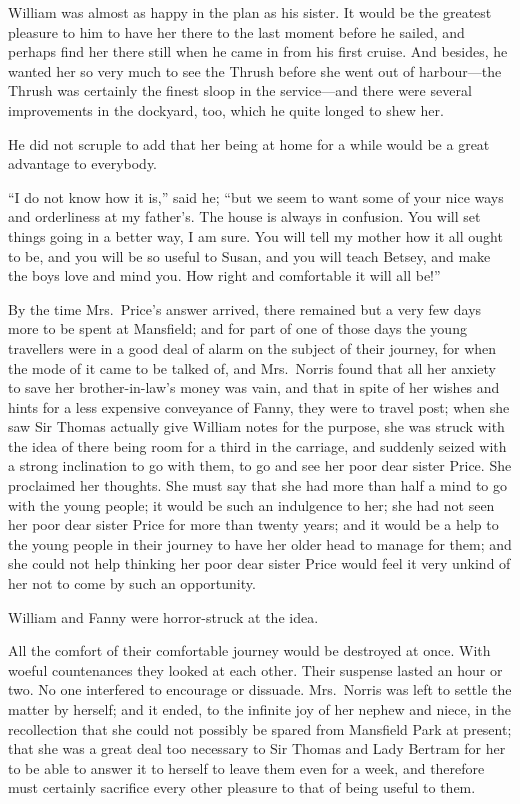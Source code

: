 \documentclass{article}
\begin{document}
William was almost as happy in the plan as his sister.
It would be the greatest pleasure to him to have her there
to the last moment before he sailed, and perhaps find
her there still when he came in from his first cruise.
And besides, he wanted her so very much to see the Thrush
before she went out of harbour---the Thrush was certainly
the finest sloop in the service---and there were several
improvements in the dockyard, too, which he quite longed to
shew her.

He did not scruple to add that her being at home
for a while would be a great advantage to everybody.

``I do not know how it is,'' said he; ``but we seem to want
some of your nice ways and orderliness at my father's. The
house is always in confusion.  You will set things going
in a better way, I am sure.  You will tell my mother how it
all ought to be, and you will be so useful to Susan, and you
will teach Betsey, and make the boys love and mind you.
How right and comfortable it will all be!''

By the time Mrs.\ Price's answer arrived, there remained
but a very few days more to be spent at Mansfield;
and for part of one of those days the young travellers
were in a good deal of alarm on the subject of their
journey, for when the mode of it came to be talked of,
and Mrs.\ Norris found that all her anxiety to save her
brother-in-law's money was vain, and that in spite of her
wishes and hints for a less expensive conveyance of Fanny,
they were to travel post; when she saw Sir Thomas actually
give William notes for the purpose, she was struck with
the idea of there being room for a third in the carriage,
and suddenly seized with a strong inclination to go
with them, to go and see her poor dear sister Price.
She proclaimed her thoughts.  She must say that she
had more than half a mind to go with the young people;
it would be such an indulgence to her; she had not seen
her poor dear sister Price for more than twenty years;
and it would be a help to the young people in their journey
to have her older head to manage for them; and she could
not help thinking her poor dear sister Price would feel it
very unkind of her not to come by such an opportunity.

William and Fanny were horror-struck at the idea.

All the comfort of their comfortable journey would
be destroyed at once.  With woeful countenances they
looked at each other.  Their suspense lasted an hour
or two.  No one interfered to encourage or dissuade.
Mrs.\ Norris was left to settle the matter by herself;
and it ended, to the infinite joy of her nephew and niece,
in the recollection that she could not possibly be spared
from Mansfield Park at present; that she was a great deal
too necessary to Sir Thomas and Lady Bertram for her to be
able to answer it to herself to leave them even for a week,
and therefore must certainly sacrifice every other pleasure
to that of being useful to them.
\end{document}
